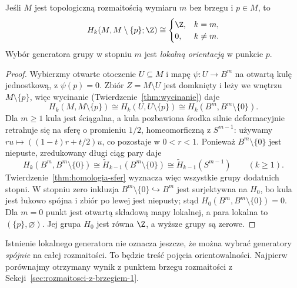 \begin{stwierdzenie}
\label{prop:lokalna-homologia}
Jeśli $M$ jest topologiczną
rozmaitością wymiaru $m$
bez brzegu i $p\in M$, to
\[
 H_k(M,M\setminus\{p\};\Z)
 \cong
 \begin{cases}\Z,&k=m,\\0,&k\ne m.\end{cases}
\]
Wybór generatora grupy w stopniu $m$
jest \emph{lokalną orientacją}
w punkcie $p$.
\end{stwierdzenie}
\begin{proof}
Wybierzmy otwarte otoczenie $U\subseteq M$ i mapę
$\psi:U\to B^m$ na otwartą kulę jednostkową,
z $\psi(p)=0$. Zbiór
$Z=M\setminus U$
jest domknięty i leży
we wnętrzu $M\setminus\{p\}$,
więc wycinanie
(Twierdzenie~\ref{thm:wycinanie})
daje
\[
 H_k(M,M\setminus\{p\})
 \cong H_k(U,U\setminus\{p\})
 \cong H_k(B^m,B^m\setminus\{0\}).
\]
Dla $m\geq1$ kula jest
ściągalna, a kula pozbawiona
środka silnie deformacyjnie retrahuje się na sferę
o promieniu $1/2$, homeomorficzną z $S^{m-1}$:
używamy $ru\mapsto((1-t)r+t/2)u$, co pozostaje w $0<r<1$.
Ponieważ $B^m\setminus\{0\}$ jest niepuste, zredukowany
długi ciąg pary daje
\[
 H_k(B^m,B^m\setminus\{0\})
 \cong\widetilde H_{k-1}(B^m\setminus\{0\})
 \cong\widetilde H_{k-1}(S^{m-1})
 \qquad(k\geq1).
\]
Twierdzenie~\ref{thm:homologia-sfer} wyznacza więc wszystkie
grupy dodatnich stopni. W stopniu zero inkluzja
$B^m\setminus\{0\}\hookrightarrow B^m$ jest surjektywna na $H_0$,
bo kula jest łukowo spójna i zbiór po lewej jest niepusty;
stąd $H_0(B^m,B^m\setminus\{0\})=0$.
Dla $m=0$ punkt jest otwartą składową
mapy lokalnej, a para lokalna to $(\{p\},\varnothing)$.
Jej grupa $H_0$ jest równa $\Z$, a wyższe grupy są zerowe.
\end{proof}

Istnienie lokalnego generatora
nie oznacza jeszcze, że można
wybrać generatory \emph{spójnie}
na całej rozmaitości. To będzie
treść pojęcia orientowalności. Najpierw porównajmy
otrzymany wynik z punktem brzegu rozmaitości
z Sekcji~\ref{sec:rozmaitosci-z-brzegiem-1}.

